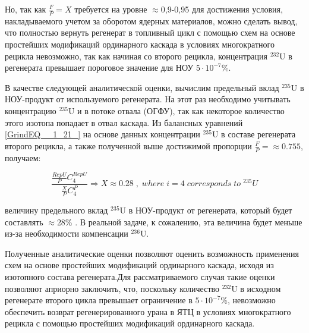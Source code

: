 Но, так как $\frac{F}{P} = X$ требуется на уровне $\approx$0,9-0,95 для достижения условия, накладываемого учетом за оборотом ядерных материалов, можно сделать вывод, что полностью вернуть регенерат в топливный цикл с помощью схем на основе простейших модификаций ординарного каскада в условиях многократного рецикла невозможно, так как начиная со второго рецикла, концентрация $^{232}$U в регенерата превышает пороговое значение для НОУ $5\cdot10^{-7}$\%.

В качестве следующей аналитической оценки, вычислим предельный вклад $^{235}$U в НОУ-продукт от используемого регенерата. На этот раз необходимо учитывать концентрацию $^{235}$U и в потоке отвала (ОГФУ), так как некоторое количество этого изотопа попадает в отвал каскада. Из балансных уравнений \ref{GrindEQ__1_21_} на основе данных концентрации $^{235}$U в составе регенерата второго рецикла, а также полученной выше достижимой пропорции  $\frac{F}{P} = \approx 0.755$, получаем:

\begin{equation}
  \label{eq_235_balance_X}
    \frac{\frac{RepU}{P}C_{4}^{RepU}}{\frac{X}{P}C_{4}^{P}} \Rightarrow X \approx 0.28\;,\;where\;i=4\;corresponds\;to\;^{235}U
\end{equation}



величину предельного вклад $^{235}$U в НОУ-продукт от регенерата, который будет составлять $\approx$28\% . В реальной задаче, к сожалению, эта величина будет меньше из-за необходимости компенсации $^{236}$U.

Полученные аналитические оценки позволяют оценить возможность применения схем на основе простейших модификаций ординарного каскада, исходя из изотопного состава регенерата.Для рассматриваемого случая такие оценки позволяют априорно заключить, что, поскольку количество $^{232}$U в исходном регенерате второго цикла превышает ограничение в $5\cdot10^{-7}$\%, невозможно обеспечить возврат регенерированного урана в ЯТЦ в условиях многократного рецикла с помощью простейших модификаций ординарного каскада.

